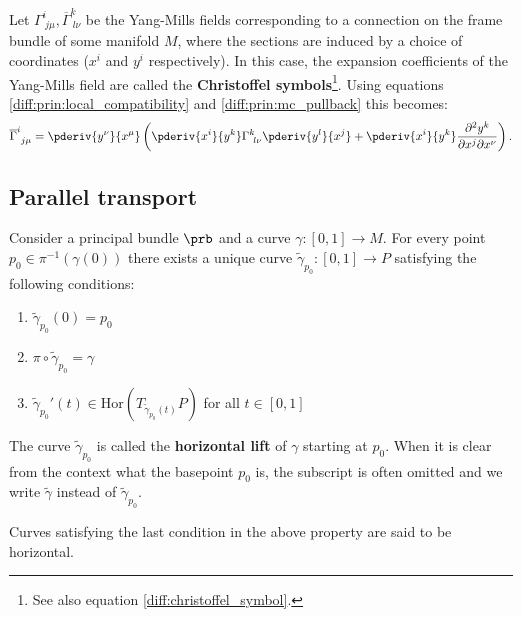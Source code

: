     \begin{example}
        Let $\Gamma^i_{\ j\mu}, \overline{\Gamma}^k_{\ l\nu}$ be the Yang-Mills fields corresponding to a connection on the frame bundle of some manifold $M$, where the sections are induced by a choice of coordinates ($x^i$ and $y^i$ respectively). In this case, the expansion coefficients of the Yang-Mills field are called the \textbf{Christoffel symbols}\footnote{See also equation \ref{diff:christoffel_symbol}.}. Using equations \ref{diff:prin:local_compatibility} and \ref{diff:prin:mc_pullback} this becomes:
        \begin{gather}
            \overline{\Gamma}^i_{\ j\mu} = \pderiv{y^\nu}{x^\mu}\left(\pderiv{x^i}{y^k}\Gamma^k_{\ l\nu}\pderiv{y^l}{x^j} + \pderiv{x^i}{y^k}\frac{\partial^2y^k}{\partial x^j\partial x^\nu}\right).
        \end{gather}
    \end{example}

\subsection{Parallel transport}

    \begin{definition}
        Consider a principal bundle $\prb$ and a curve $\gamma:[0, 1]\rightarrow M$. For every point $p_0\in \pi^{-1}(\gamma(0))$ there exists a unique curve $\widetilde{\gamma}_{p_0}:[0, 1]\rightarrow P$ satisfying the following conditions:
        \begin{enumerate}
            \item $\widetilde{\gamma}_{p_0}(0) = p_0$
            \item $\pi\circ\widetilde{\gamma}_{p_0} = \gamma$
            \item $\widetilde{\gamma}_{p_0}'(t)\in\text{Hor}(T_{\widetilde{\gamma}_{p_0}(t)}P)$ for all $t\in[0, 1]$
        \end{enumerate}
        The curve $\widetilde{\gamma}_{p_0}$ is called the \textbf{horizontal lift} of $\gamma$ starting at $p_0$. When it is clear from the context what the basepoint $p_0$ is, the subscript is often omitted and we write $\widetilde{\gamma}$ instead of $\widetilde{\gamma}_{p_0}$.
    \end{definition}
    \begin{remark}
        Curves satisfying the last condition in the above property are said to be horizontal.
    \end{remark}

